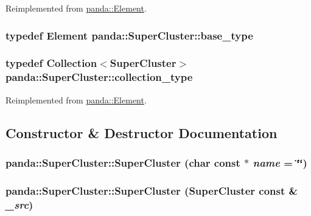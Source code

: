 Reimplemented from \hyperlink{classpanda_1_1Element_ab2756a177602f7ab426c4e5d5dbb3b68}{panda::Element}.\hypertarget{classpanda_1_1SuperCluster_ac758e93cf5909e6c943c622795671e99}{
\subsubsection[{base\_\-type}]{\setlength{\rightskip}{0pt plus 5cm}typedef {\bf Element} {\bf panda::SuperCluster::base\_\-type}}}
\label{classpanda_1_1SuperCluster_ac758e93cf5909e6c943c622795671e99}
\hypertarget{classpanda_1_1SuperCluster_aaf5d3b9ba38cb0ac66de7fab09f58530}{
\subsubsection[{collection\_\-type}]{\setlength{\rightskip}{0pt plus 5cm}typedef {\bf Collection}$<${\bf SuperCluster}$>$ {\bf panda::SuperCluster::collection\_\-type}}}
\label{classpanda_1_1SuperCluster_aaf5d3b9ba38cb0ac66de7fab09f58530}


Reimplemented from \hyperlink{classpanda_1_1Element_ae8518ee6466644a9abe229a1da0bae57}{panda::Element}.

\subsection{Constructor \& Destructor Documentation}
\hypertarget{classpanda_1_1SuperCluster_a728e325c14728f826df3d70f998f8b50}{
\subsubsection[{SuperCluster}]{\setlength{\rightskip}{0pt plus 5cm}panda::SuperCluster::SuperCluster (char const $\ast$ {\em name} = {\ttfamily \char`\"{}\char`\"{}})}}
\label{classpanda_1_1SuperCluster_a728e325c14728f826df3d70f998f8b50}
\hypertarget{classpanda_1_1SuperCluster_a7d63e98ed439711dc6c3ac3cb478b381}{
\subsubsection[{SuperCluster}]{\setlength{\rightskip}{0pt plus 5cm}panda::SuperCluster::SuperCluster ({\bf SuperCluster} const \& {\em \_\-src})}}
\label{classpanda_1_1SuperCluster_a7d63e98ed439711dc6c3ac3cb478b381}


